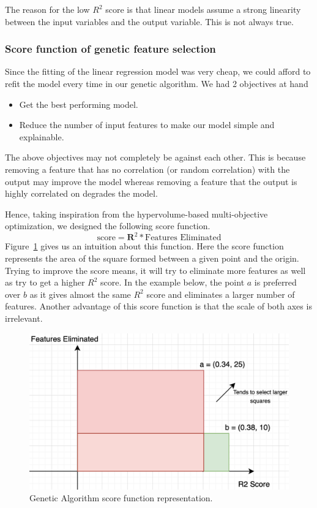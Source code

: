 \documentclass[11pt]{article}
\begin{document}
The reason for the low $R^2$ score is that linear models assume a strong linearity between the input variables and the output variable.
This is not always true.

\subsubsection{Score function of genetic feature selection}
Since the fitting of the linear regression model was very cheap, we could afford to refit the model every time in our genetic algorithm.
We had 2 objectives at hand
\begin{itemize}
\item Get the best performing model.
\item Reduce the number of input features to make our model simple and explainable.
\end{itemize}
The above objectives may not completely be against each other.
This is because removing a feature that has no correlation (or random correlation) with the output may improve the model whereas removing a feature that the output is highly correlated on degrades the model.


Hence,  taking inspiration from the hypervolume-based multi-objective optimization, we designed the following score function.
$$
\textrm{score} = \mathbf{R}^2 * \textrm{Features Eliminated}
$$
Figure~\ref{fig:scorefunctionfigure} gives us an intuition about this function.
Here the score function represents the area of the square formed between a given point and the origin.
Trying to improve the score means,  it will try to eliminate more features as well as try to get a higher $R^2$ score.
In the example below,  the point $a$ is preferred over $b$ as it gives almost the same $R^2$ score and eliminates a larger number of features.
Another advantage of this score function is that the scale of both axes is irrelevant.

\begin{figure}[htb]
  \centering
    \includegraphics[scale=0.5]{images/scoreFuntionMultiObject}
    \caption{Genetic Algorithm score function representation.}
    \label{fig:scorefunctionfigure}
\end{figure}
\end{document}
